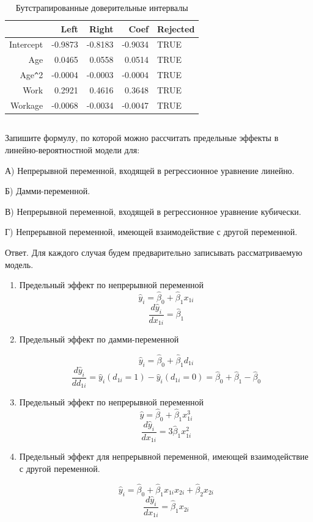 \documentclass[a4paper,12pt]{article}
\def \hb{\hat{\beta}}
\def \hy{\hat{y}}
\def \hb{\hat{\beta}}
\begin{document}
\begin{table}[ht]
	\centering
	\begin{tabular}{|rrrrl|}
		\hline
		& Left & Right & Coef & Rejected \\ 
		\hline
		Intercept & -0.9873 & -0.8183 & -0.9034 & TRUE \\ 
		Age & 0.0465 & 0.0558 & 0.0514 & TRUE \\ 
		Age\verb|^|2 & -0.0004 & -0.0003 & -0.0004 & TRUE \\ 
		Work & 0.2921 & 0.4616 & 0.3648 & TRUE \\ 
		Workage & -0.0068 & -0.0034 & -0.0047 & TRUE \\ 
		\hline
	\end{tabular}
\caption{Бутстрапированные доверительные интервалы}
\end{table}

\subsection{}
 \Sun Запишите формулу, по которой можно рассчитать предельные эффекты в
линейно-вероятностной модели для:

А) Непрерывной переменной, входящей в регрессионное уравнение линейно.

Б) Дамми-переменной.

В) Непрерывной переменной, входящей в регрессионное уравнение кубически.

Г) Непрерывной переменной, имеющей взаимодействие с другой переменной.

Ответ. Для каждого случая будем предварительно записывать рассматриваемую модель. 

\begin{enumerate}[\Sun]
	\item Предельный эффект по непрерывной переменной
	\[ \hat{y}_i = \hat{\beta}_0 + \hat{\beta}_1 x_{1i}\]
	\[ \frac{d\hy_i}{dx_{1i}} = \hb_1 \]
	
	\item Предельный эффект по дамми-переменной
	
	\[ \hat{y}_i = \hat{\beta}_0 + \hat{\beta}_1 d_{1i}\]
	\[ \frac{d\hy_i}{dd_{1i}} = \hy_i(d_{1i}=1) - \hy_i(d_{1i}=0) =   \hat{\beta}_0 + \hat{\beta}_1 - \hat{\beta}_0 \]
	
	\item Предельный эффект по непрерывной переменной
	\[ \hat{y} = \hat{\beta}_0 + \hat{\beta}_1 x_{1i}^3\]
	\[ \frac{d\hy_i}{dx_{1i}} = 3\hb_1x_{1i}^2 \]
	
	\item Предельный эффект для непрерывной переменной, имеющей взаимодействие с другой переменной.
	
	\[ \hat{y}_i = \hat{\beta}_0 + \hat{\beta}_1 x_{1i}x_{2i} + \hb_2 x_{2i}\]
	\[ \frac{d\hy_i}{dx_{1i}} = \hb_1 x_{2i} \]	
\end{enumerate}
\end{document}
